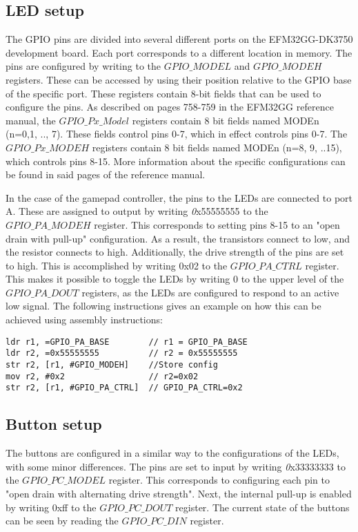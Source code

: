 \subsection{LED setup}\label{led-setup}

The GPIO pins are divided into several different ports on the EFM32GG-DK3750 development board. Each port corresponds to a different location in memory.  The pins are configured by writing to the $GPIO\_MODEL$ and $GPIO\_MODEH$ registers. These can be accessed by using their position relative to the GPIO base of the specific port. These registers contain 8-bit fields that can be used to configure the pins. As described on pages 758-759 in the EFM32GG reference manual, the $GPIO\_Px\_Model$ registers contain 8 bit fields named MODEn (n=0,1, .., 7). These fields control pins 0-7, which in effect controls pins 0-7. The $GPIO\_Px\_MODEH$ registers contain 8 bit fields named MODEn (n=8, 9, ..15), which controls pins 8-15. More information about the specific configurations can be found in said pages of the reference manual.

In the case of the gamepad controller, the pins to the LEDs are connected to port A. These are assigned to output by writing {\emph 0x55555555} to  the $GPIO\_PA\_MODEH$ register. This corresponds to setting pins 8-15 to an "open drain with pull-up" configuration\cite[p.758-759]{EFM32GG-rm}. As a result, the transistors connect to low, and the resistor connects to high. Additionally, the drive strength of the pins are set to high. This is accomplished by writing 0x02 to the $GPIO\_PA\_CTRL$ register. This makes it possible to toggle the LEDs by writing 0 to the upper level of the $GPIO\_PA\_DOUT$ registers, as the LEDs are configured to respond to an active low signal. The following instructions gives an example on how this can be achieved using assembly instructions:


\begin{lstlisting}
ldr r1, =GPIO_PA_BASE        // r1 = GPIO_PA_BASE
ldr r2, =0x55555555          // r2 = 0x55555555  
str r2, [r1, #GPIO_MODEH]    //Store config
mov r2, #0x2                 // r2=0x02
str r2, [r1, #GPIO_PA_CTRL]  // GPIO_PA_CTRL=0x2                    

\end{lstlisting}



\subsection{Button setup}\label{ch:buttons}
The buttons are configured in a similar way to the configurations of the LEDs, with some minor differences. The pins are set to input by writing {\emph 0x33333333} to the $GPIO\_PC\_MODEL$ register. This corresponds to configuring each pin to "open drain with alternating drive strength"\cite[p.758-759]{EFM32GG-rm}. Next, the internal pull-up is enabled by writing 0xff to the $GPIO\_PC\_DOUT$ register. The current state of the buttons can be seen by reading the $GPIO\_PC\_DIN$ register. 

